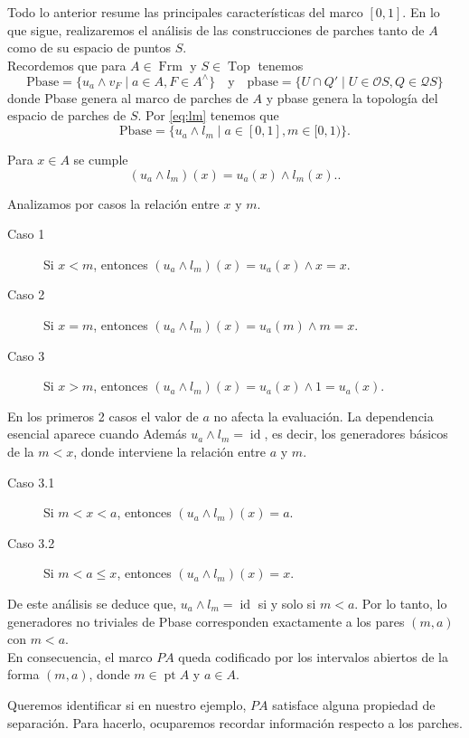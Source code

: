 \documentclass[11pt]{amsart}
\DeclareMathOperator{\pt}{pt}
\DeclareMathOperator{\id}{id}
\DeclareMathOperator{\Frm}{Frm}
\DeclareMathOperator{\Top}{Top}
\theoremstyle{plain}
\theoremstyle{definition}
\begin{document}
Todo lo anterior resume las principales características del marco $[0,1]$. En lo que sigue, realizaremos el análisis de las construcciones de parches tanto de 
$A$ como de su espacio de puntos $S$.\\

Recordemos que para $A\in \Frm$ y $S\in \Top$ tenemos 
\[
\text{Pbase}=\{u_a\wedge v_F\mid a\in A, F\in A^\wedge\}\quad \text{y}\quad \text{pbase}=\{U\cap Q'\mid U\in \mathcal{O}S, Q\in \mathcal{Q}S\}
\]
donde Pbase genera al marco de parches de $A$ y pbase genera la topología del espacio de parches de $S$. Por \eqref{eq:lm} tenemos que 
\[
\text{Pbase}=\{u_a\wedge l_m\mid a\in [0,1], m\in [0,1)\}.
\]

Para $x\in A$  se cumple
\[
(u_a\wedge l_m)(x)=u_a(x)\wedge l_m(x)..
\]

Analizamos por casos la relación entre $x$ y $m$.
\begin{description}
\item[Caso 1] Si $x<m$, entonces $(u_a\wedge l_m)(x)=u_a(x)\wedge x=x$.
\item[Caso 2] Si $x=m$, entonces $(u_a\wedge l_m)(x)=u_a(m)\wedge m=x$.
\item[Caso 3] Si $x>m$, entonces $(u_a\wedge l_m)(x)=u_a(x)\wedge 1=u_a(x)$.
\end{description}

En los primeros 2 casos el valor de $a$ no afecta la evaluación. La dependencia esencial aparece cuando Además $u_a\wedge l_m=\id$, es decir, los generadores básicos de la 
$m<x$, donde interviene la relación entre $a$ y $m$.
\begin{description}
\item[Caso 3.1] Si $m<x<a$, entonces $(u_a\wedge l_m)(x)=a$.
\item[Caso 3.2] Si $m<a\leq x$, entonces $(u_a\wedge l_m)(x)=x$.
\end{description}

De este análisis se deduce que, $u_a\wedge l_m=\id$ si y solo si $m<a$. Por lo tanto, lo generadores no triviales de Pbase corresponden exactamente a los pares
$(m, a)$ con $m<a$.\\

En consecuencia, el marco $PA$ queda codificado por los intervalos abiertos de la forma $(m,a)$, donde $m\in \pt A$ y $a\in A$.

Queremos identificar si en nuestro ejemplo, $PA$ satisface alguna propiedad de separación. Para hacerlo, ocuparemos recordar información respecto a los parches.\\
\end{document}
